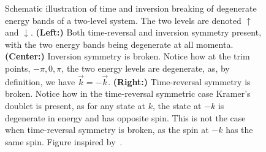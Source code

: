 \begin{figure}[h]
  \caption{Schematic illustration of time and inversion breaking of degenerate energy bands of a two-level system.
    The  two levels are denoted $\uparrow$ and $\downarrow$.
    \textbf{(Left:)} Both time-reversal and inversion symmetry present, with the two energy bands being degenerate at all momenta.
    \textbf{(Center:)} Inversion symmetry is broken. Notice how at the \gls{trim} points, $-\pi, 0, \pi$, the two energy levels are degenerate, as, by definition, we have $\vec{k} = -\vec{k}$.
    \textbf{(Right:)} Time-reversal symmetry is broken.
    Notice how in the time-reversal symmetric case Kramer's doublet is present, as for any state at $k$, the state at $-k$ is degenerate  in energy and has opposite spin.
    This is not the case when time-reversal symmetry is broken, as the spin at  $-k$ has the same spin.
    Figure inspired by~\textcite{ramazashviliZeemanSpinorbitCoupling2019}.
  }
  \label{fig:symmetry_considerations}
\end{figure}

